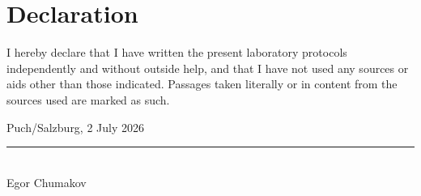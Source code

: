 \clearpage
\thispagestyle{empty}
\section*{Declaration}

I hereby declare that I have written the present laboratory protocols
independently and without outside help, and that I have not used any
sources or aids other than those indicated. Passages taken literally or
in content from the sources used are marked as such.

\vspace*{1.5cm}

Puch/Salzburg, 2 July 2026

\vspace*{1.5cm}

\rule{6cm}{0.4pt}\\
Egor Chumakov

